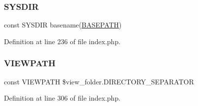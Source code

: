 \subsubsection{\texorpdfstring{SYSDIR}{SYSDIR}}
{\footnotesize\ttfamily const S\+Y\+S\+D\+IR basename(\mbox{\hyperlink{index_8php_ad39801cabfd338dc5524466fe793fda9}{B\+A\+S\+E\+P\+A\+TH}})}



Definition at line 236 of file index.\+php.

\mbox{\label{index_8php_ade8921d52af58583e5727833459224c3}} 
\subsubsection{\texorpdfstring{VIEWPATH}{VIEWPATH}}
{\footnotesize\ttfamily const V\+I\+E\+W\+P\+A\+TH \$view\+\_\+folder.\+D\+I\+R\+E\+C\+T\+O\+R\+Y\+\_\+\+S\+E\+P\+A\+R\+A\+T\+OR}



Definition at line 306 of file index.\+php.

